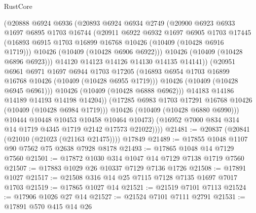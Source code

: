 \begin{lexlean}{RustCore}
\begin{coremodule}
                    (@20888
                      @6924
                      @6936
                      (@20893
                        @6924
                        @6934
                        @2749
                        (@20900
                          @6923
                          @6933
                          @1697
                          @6895
                          @1703
                          @16744
                          (@20911
                            @6922
                            @6932
                            @1697
                            @6905
                            @1703
                            @17445
                            (@16893 @6915 @1703 @16899 @16768 @10426 (@10409 (@10428 @6916 @1719)))
                            @10426
                            (@10409 (@10428 @6906 @6922)))
                          @10426
                          (@10409 (@10428 @6896 @6923)))
                        @14120
                        @14123
                        @14126
                        @14130
                        @14135
                        @14141))
                    (@20951
                      @6961
                      @6971
                      @1697
                      @6944
                      @1703
                      @17205
                      (@16893 @6954 @1703 @16899 @16768 @10426 (@10409 (@10428 @6955 @1719)))
                      @10426
                      (@10409 (@10428 @6945 @6961)))
                    @10426
                    (@10409 (@10428 @6888 @6962)))
                  @14183
                  @14186
                  @14189
                  @14193
                  @14198
                  @14204))
              (@17285 @6983 @1703 @17291 @16768 @10426 (@10409 (@10428 @6984 @1719)))
              @10426
              (@10409 (@10428 @6880 @6990)))
            @10444
            @10448
            @10453
            @10458
            @10464
            @10473)
          (@16952 @7000 @834 @314 @14 @1719 @4345 @1719 @2142 @17573 @21022))))
@21481 := @20837 (@20841 (@21010 (@21023 (@21163 @21475)))) @17849
@21489 := @17855 @1048 @1107 @90 @7562 @75 @2638 @7928 @8178
@21493 := @17865 @1048 @14 @7129 @7560
@21501 := @17872 @1030 @314 @1047 @14 @7129 @7138 @1719 @7560
@21507 := @17883 @1029 @26 @10337 @7129 @7136 @1726
@21508 := @17891 @1027
@21517 := @21508 @316 @14 @25 @7115 @7128 @7135 @1697 @7017 @1703
@21519 := @17865 @1027 @14
@21521 := @21519 @7101 @7113
@21524 := @17906 @1026 @27 @14
@21527 := @21524 @7101 @7111 @2791
@21531 := @17891 @570 @415 @14 @26

\end{coremodule}
\end{lexlean}
